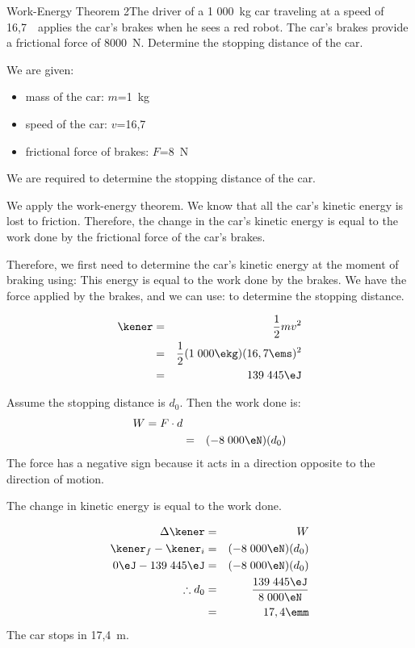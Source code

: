\begin{wex}{Work-Energy Theorem 2}{The driver of a 1 000~kg car traveling at a speed of 16,7~\ms\ applies the car's brakes when he sees a red robot. The car's brakes provide a frictional force of 8000~N. Determine the stopping distance of the car.}
{
We are given:
\begin{itemize}
\item{mass of the car: $m$=1~kg}
\item{speed of the car: $v$=16,7~\ms}
\item{frictional force of brakes: $F$=8~N}
\end{itemize}
We are required to determine the stopping distance of the car.

We apply the work-energy theorem. We know that all the car's kinetic energy is lost to friction. Therefore, the change in the car's kinetic energy is equal to the work done by the frictional force of the car's brakes.

Therefore, we first need to determine the car's kinetic energy at the moment of braking using:
This energy is equal to the work done by the brakes. We have the force applied by the brakes, and we can use:
to determine the stopping distance.

\begin{eqnarray*}
\kener&=&\frac{1}{2}mv^2\\
&=&\frac{1}{2}(1\;000\ekg)(16,7\ems)^2\\
&=&139\;445\eJ
\end{eqnarray*}

Assume the stopping distance is $d_0$. Then the work done is:
\begin{eqnarray*}
W=F\cdot d\\
&=&(-8\;000\eN)(d_0)
\end{eqnarray*}
The force has a negative sign because it acts in a direction opposite to the direction of motion.

The change in kinetic energy is equal to the work done.

\begin{eqnarray*}
\Delta \kener &=&W\\
\kener_f - \kener_i&=&(-8\;000\eN)(d_0)\\
0\eJ - 139\;445\eJ&=&(-8\;000\eN)(d_0)\\
\therefore d_0&=&\frac{139\;445\eJ}{8\;000\eN}\\
&=&17,4\emm
\end{eqnarray*}
The car stops in 17,4~m.}
\end{wex}

